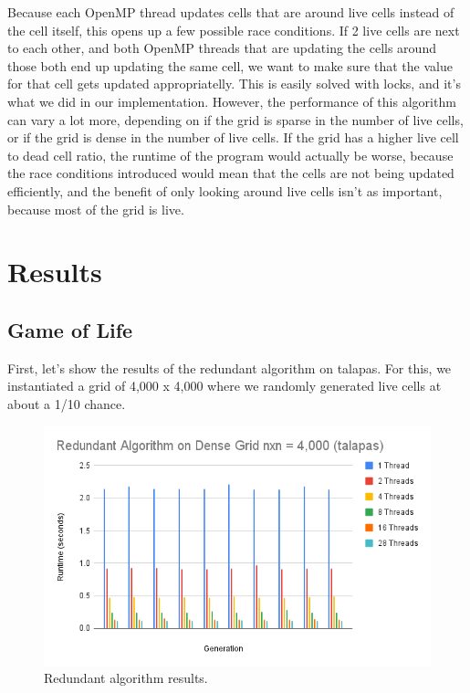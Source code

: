 \documentclass[12pt]{article}
\begin{document}
Because each OpenMP thread updates cells that are around live cells instead of the cell itself, this opens up a few possible race conditions. If 2 live cells are next to each other, and both OpenMP threads that are updating the cells around those both end up updating the same cell, we want to make sure that the value for that cell gets updated appropriatelly. This is easily solved with locks, and it's what we did in our implementation. However, the performance of this algorithm can vary a lot more, depending on if the grid is sparse in the number of live cells, or if the grid is dense in the number of live cells. If the grid has a higher live cell to dead cell ratio, the runtime of the program would actually be worse, because the race conditions introduced would mean that the cells are not being updated efficiently, and the benefit of only looking around live cells isn't as important, because most of the grid is live.

\section{Results}

\subsection{Game of Life}
First, let's show the results of the redundant algorithm on talapas. For this, we instantiated a grid of 4,000 x 4,000 where we randomly generated live cells at about a 1/10 chance.

\begin{figure}[ht]
\centering
\includegraphics[width=\linewidth]{redundant_4000.PNG}
\caption{\label{fig:chart_1}Redundant algorithm results.}
\end{figure}
\end{document}
